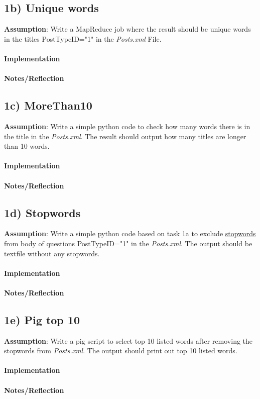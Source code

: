 \documentclass[fleqn,10pt]{wlscirep}
\begin{document}
\subsection*{1b) Unique words}
\textbf{Assumption}: Write a MapReduce job where the result should be unique words in the titles PostTypeID="1" in the \textit{Posts.xml} File. \\ \\
\textbf{Implementation}  \\ \\
\textbf{Notes/Reflection}

\subsection*{1c) MoreThan10}
\textbf{Assumption}: Write a simple python code to check how many words there is in the title in the \textit{Posts.xml}. The result should output how many titles are longer than 10 words.  \\ \\
\textbf{Implementation}  \\ \\
\textbf{Notes/Reflection}

\subsection*{1d) Stopwords}
\textbf{Assumption}: Write a simple python code based on task 1a to exclude \href{https://raw.githubusercontent.com/naimdjon/stopwords/master/stopwords.txt}{stopwords} from body of questions PostTypeID="1" in the \textit{Posts.xml}. The output should be textfile without any stopwords. \\ \\
\textbf{Implementation}  \\ \\
\textbf{Notes/Reflection}

\subsection*{1e) Pig top 10}
\textbf{Assumption}: Write a pig script to select top 10 listed words after removing the stopwords from \textit{Posts.xml}. The output should print out top 10 listed words.\\ \\
\textbf{Implementation}  \\ \\
\textbf{Notes/Reflection}
\end{document}
